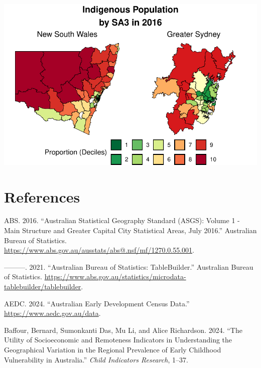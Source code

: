 \documentclass[
  letterpaper,
  DIV=11,
  numbers=noendperiod]{scrartcl}
\newlength{\cslhangindent}
\newenvironment{CSLReferences}[2] %
 {\begin{list}{}{%
  \setlength{\itemindent}{0pt}
  \setlength{\leftmargin}{0pt}
  \setlength{\parsep}{0pt}
  \ifodd #1
   \setlength{\leftmargin}{\cslhangindent}
   \setlength{\itemindent}{-1\cslhangindent}
  \fi
  \setlength{\itemsep}{#2\baselineskip}}}
 {\end{list}}
\begin{document}
\includegraphics{variable_def_and_maps_files/figure-pdf/maps-indig-1.pdf}

\section{References}\label{references}

\label{refs}
\begin{CSLReferences}{1}{0}
ABS. 2016. {``Australian Statistical Geography Standard (ASGS): Volume 1
- Main Structure and Greater Capital City Statistical Areas, July
2016.''} Australian Bureau of Statistics.
\url{https://www.abs.gov.au/ausstats/abs@.nsf/mf/1270.0.55.001}.

---------. 2021. {``Australian Bureau of Statistics: TableBuilder.''}
Australian Bureau of Statistics.
\url{https://www.abs.gov.au/statistics/microdata-tablebuilder/tablebuilder}.

AEDC. 2024. {``Australian Early Development Census Data.''}
\url{https://www.aedc.gov.au/data}.

Baffour, Bernard, Sumonkanti Das, Mu Li, and Alice Richardson. 2024.
{``The Utility of Socioeconomic and Remoteness Indicators in
Understanding the Geographical Variation in the Regional Prevalence of
Early Childhood Vulnerability in Australia.''} \emph{Child Indicators
Research}, 1--37.

\end{CSLReferences}
\end{document}

